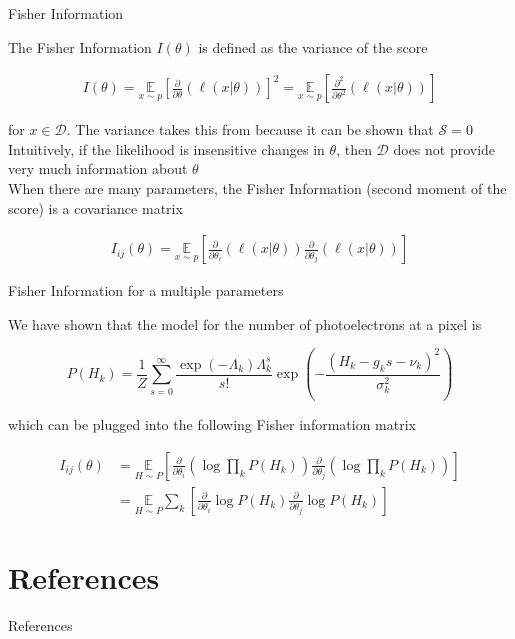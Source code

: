 \documentclass[aspectratio=1610]{beamer}					%
\begin{document}
\begin{frame}{Fisher Information}

The Fisher Information $I(\theta)$ is defined as the variance of the score

\begin{align*}
I(\theta) = \underset{{x\sim p}}{\mathbb{E}}\left[\frac{\partial}{\partial\theta} \left(\ell(x|\theta)\right)\right]^{2} = \underset{{x\sim p}}{\mathbb{E}}\left[\frac{\partial^{2}}{\partial\theta^{2}} \left(\ell(x|\theta)\right)\right]
\end{align*}

for $x\in\mathcal{D}$. The variance takes this from because it can be shown that $\mathcal{S}=0$\\
\vspace{0.1in}
Intuitively, if the likelihood is insensitive changes in $\theta$, then $\mathcal{D}$ does not provide very much information about $\theta$\\

When there are many parameters, the Fisher Information (second moment of the score) is a covariance matrix

\begin{align*}
I_{ij}(\theta) = \underset{{x\sim p}}{\mathbb{E}}\left[\frac{\partial}{\partial\theta_{i}} \left(\ell(x|\theta)\right)\frac{\partial}{\partial\theta_{j}} \left(\ell(x|\theta)\right)\right]
\end{align*}


\end{frame}

\begin{frame}{Fisher Information for a multiple parameters}

We have shown that the model for the number of photoelectrons at a pixel is

\begin{equation*}
P(H_{k}) = \frac{1}{Z}\sum_{s=0}^{\infty}\frac{\exp\left({-\Lambda_{k}}\right)\Lambda_{k}^{s}}{s!}\exp\left(-\frac{(H_{k}-g_{k}s-\nu_{k})^{2}}{\sigma_{k}^{2}}\right)
\end{equation*}

which can be plugged into the following Fisher information matrix

\begin{align*}
I_{ij}(\theta) &= \underset{{H\sim P}}{\mathbb{E}}\left[\frac{\partial}{\partial\theta_{i}} \left(\log \prod_{k} P(H_{k})\right)\frac{\partial}{\partial\theta_{j}} \left(\log \prod_{k} P(H_{k})\right)\right]\\
&= \underset{{H\sim P}}{\mathbb{E}}\sum_{k}\left[\frac{\partial}{\partial\theta_{i}} \log P(H_{k})\frac{\partial}{\partial\theta_{j}} \log P(H_{k})\right]
\end{align*}

\end{frame}



\section{References}

\begin{frame}[allowframebreaks]{References}
	\tiny
	
\end{frame}
\end{document}
